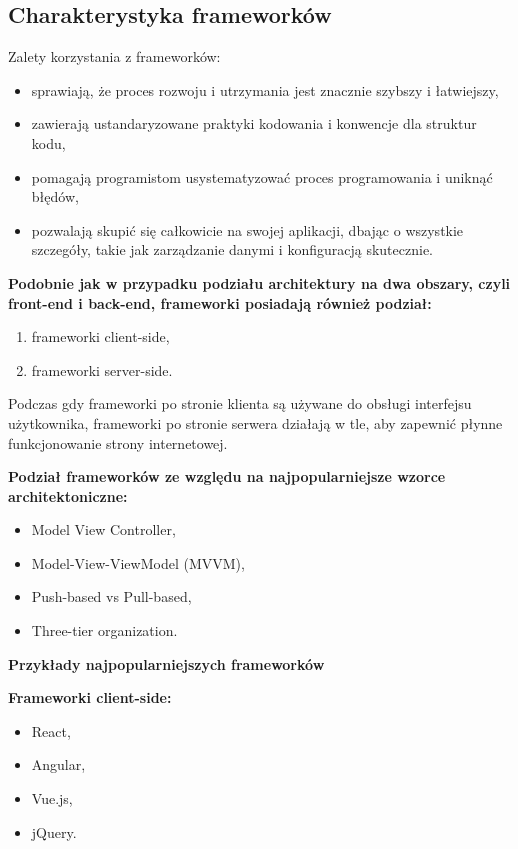 \subsection{Charakterystyka frameworków}

Zalety korzystania z frameworków:
\begin{itemize}
\item sprawiają, że proces rozwoju i utrzymania jest znacznie szybszy i łatwiejszy,
\item zawierają ustandaryzowane praktyki kodowania i konwencje dla struktur kodu,
\item pomagają programistom usystematyzować proces programowania i uniknąć błędów,
\item pozwalają skupić się całkowicie na swojej aplikacji, dbając o wszystkie szczegóły, takie jak zarządzanie danymi i konfiguracją skutecznie.
\end{itemize}

\textbf{Podobnie jak w przypadku podziału architektury na dwa obszary, czyli front-end i back-end, frameworki posiadają również podział:}
\begin{enumerate}
    \item frameworki client-side,
    \item frameworki server-side.
\end{enumerate}

Podczas gdy frameworki po stronie klienta są używane do obsługi interfejsu użytkownika, frameworki po stronie serwera działają w tle, aby zapewnić płynne funkcjonowanie strony internetowej.

\textbf{Podział frameworków ze względu na najpopularniejsze wzorce architektoniczne:}
\begin{itemize}
\item Model View Controller,
\item Model-View-ViewModel (MVVM),
\item Push-based vs Pull-based,
\item Three-tier organization.
\end{itemize}

\textbf{Przykłady najpopularniejszych frameworków}

\textbf{Frameworki client-side:}
\begin{itemize}
\item React,
\item Angular,
\item Vue.js,
\item jQuery.
\end{itemize}

